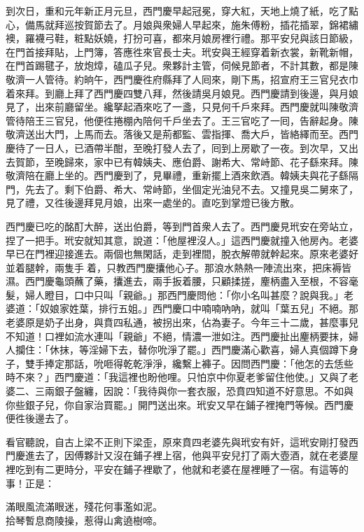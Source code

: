 到次日，重和元年新正月元旦，西門慶早起冠冕，穿大紅，天地上燒了紙，吃了點心，備馬就拜巡按賀節去了。月娘與衆婦人早起來，施朱傅粉，插花插翠，錦裙繡襖，羅襪弓鞋，粧點妖嬈，打扮可喜，都來月娘房裡行禮。那平安兒與該日節級，在門首接拜貼，上門簿，答應徃來官長士夫。玳安與王經穿着新衣裳，新靴新帽，在門首踢毽子，放炮𤍤，磕瓜子兒。衆夥計主管，伺候見節者，不計其數，都是陳敬濟一人管待。{}約晌午，西門慶徃府縣拜了人囘來，剛下馬，招宣府王三官兒衣巾着來拜。到廳上拜了西門慶四雙八拜，然後請吳月娘見。西門慶請到後邊，與月娘見了，出來前廳留坐。纔拏起酒來吃了一盞，只見何千戶來拜。西門慶就叫陳敬濟管待陪王三官兒，他便徃捲棚內陪何千戶坐去了。王三官吃了一囘，告辭起身。陳敬濟送出大門，上馬而去。落後又是荊都監、雲指揮、喬大戶，皆絡繹而至。西門慶待了一日人，已酒帶半酣，至晚打發人去了，囘到上房歇了一夜。到次早，又出去賀節，至晚歸來，家中已有韓姨夫、應伯爵、謝希大、常峙節、花子繇來拜。陳敬濟陪在廳上坐的。西門慶到了，見畢禮，重新擺上酒來飲酒。韓姨夫與花子繇隔門，先去了。剩下伯爵、希大、常峙節，坐個定光油兒不去。{}又撞見吳二舅來了，見了禮，又徃後邊拜見月娘，出來一處坐的。直吃到掌燈已後方散。

西門慶已吃的酩酊大醉，送出伯爵，等到門首衆人去了。西門慶見玳安在旁站立，捏了一把手。玳安就知其意，說道：「他屋裡沒人。」這西門慶就撞入他房內。老婆早已在門裡迎接進去。{}兩個也無閑話，走到裡間，脫衣解帶就幹起來。原來老婆好並着腿幹，兩隻手𢵞着，只教西門慶攮他心子。那浪水熱熱一陣流出來，把床褥皆濕。西門慶龜頭蘸了藥，攮進去，兩手扳着腰，只顧揉搓，麈柄盡入至根，不容毫髮，婦人瞪目，口中只叫「親爺。」那西門慶問他：「你小名叫甚麼？說與我。」老婆道：「奴娘家姓葉，排行五姐。」西門慶口中喃喃吶吶，就叫「葉五兒」不絕。那老婆原是奶子出身，與賁四私通，被拐出來，佔為妻子。今年三十二歲，甚麼事兒不知道！口裡如流水連叫「親爺」不絕，情濃一泄如注。西門慶扯出麈柄要抹，婦人攔住：「休抹，等淫婦下去，替你吮淨了罷。」西門慶滿心歡喜，婦人真個蹲下身子，雙手捧定那話，吮咂得乾乾淨淨，纔繫上褲子。因問西門慶：「他怎的去恁些時不來？」西門慶道：「我這裡也盼他哩。只怕京中你夏老爹留住他使。」又與了老婆二、三兩銀子盤纏，因說：「我待與你一套衣服，恐賁四知道不好意思。不如與你些銀子兒，你自家治買罷。」開門送出來。玳安又早在鋪子裡掩門等候。西門慶便徃後邊去了。

看官聽說，自古上梁不正則下梁歪，原來賁四老婆先與玳安有奸，這玳安剛打發西門慶進去了，因傅夥計又沒在鋪子裡上宿，他與平安兒打了兩大壺酒，就在老婆屋裡吃到有二更時分，平安在鋪子裡歇了，他就和老婆在屋裡睡了一宿。有這等的事！正是：

\begin{myquote}
滿眼風流滿眼迷，殘花何事濫如泥。\\拾琴暫息商陵操，惹得山禽遶樹啼。
\end{myquote}

